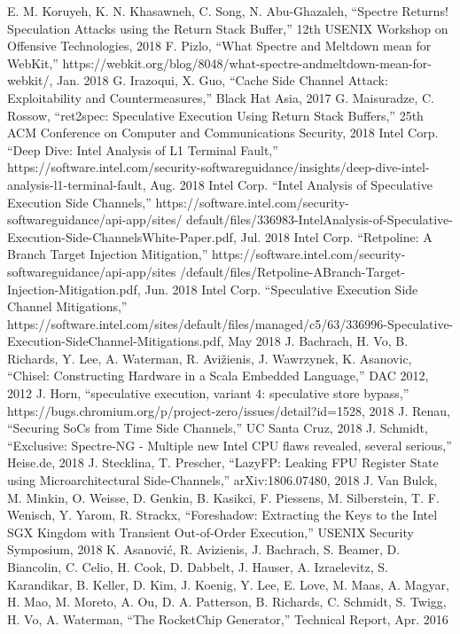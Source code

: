 \begin{thebibliography}{00}
     E. M. Koruyeh, K. N. Khasawneh, C. Song, N. Abu-Ghazaleh, ``Spectre Returns! Speculation Attacks using the Return Stack Buffer,'' 12th USENIX Workshop on Offensive Technologies, 2018
     F. Pizlo, ``What Spectre and Meltdown mean for WebKit,'' https://webkit.org/blog/8048/what-spectre-andmeltdown-mean-for-webkit/, Jan. 2018
     G. Irazoqui, X. Guo, ``Cache Side Channel Attack: Exploitability and Countermeasures,'' Black Hat Asia, 2017
     G. Maisuradze, C. Rossow, ``ret2spec: Speculative Execution Using Return Stack Buffers,'' 25th ACM Conference on Computer and Communications Security, 2018
     Intel Corp. ``Deep Dive: Intel Analysis of L1 Terminal Fault,'' https://software.intel.com/security-softwareguidance/insights/deep-dive-intel-analysis-l1-terminal-fault, Aug. 2018
     Intel Corp. ``Intel Analysis of Speculative Execution Side Channels,'' https://software.intel.com/security-softwareguidance/api-app/sites/ default/files/336983-IntelAnalysis-of-Speculative-Execution-Side-ChannelsWhite-Paper.pdf, Jul. 2018
     Intel Corp. ``Retpoline: A Branch Target Injection Mitigation,'' https://software.intel.com/security-softwareguidance/api-app/sites /default/files/Retpoline-ABranch-Target-Injection-Mitigation.pdf, Jun. 2018
     Intel Corp. ``Speculative Execution Side Channel Mitigations,'' https://software.intel.com/sites/default/files/managed/c5/63/336996-Speculative-Execution-SideChannel-Mitigations.pdf, May 2018
     J. Bachrach, H. Vo, B. Richards, Y. Lee, A. Waterman, R. Avižienis, J. Wawrzynek, K. Asanovic, ``Chisel: Constructing Hardware in a Scala Embedded Language,'' DAC 2012, 2012
     J. Horn, ``speculative execution, variant 4: speculative store bypass,'' https://bugs.chromium.org/p/project-zero/issues/detail?id=1528, 2018
     J. Renau, ``Securing SoCs from Time Side Channels,'' UC Santa Cruz, 2018
     J. Schmidt, ``Exclusive: Spectre-NG - Multiple new Intel CPU flaws revealed, several serious,'' Heise.de, 2018
     J. Stecklina, T. Prescher, ``LazyFP: Leaking FPU Register State using Microarchitectural Side-Channels,'' arXiv:1806.07480, 2018
     J. Van Bulck, M. Minkin, O. Weisse, D. Genkin, B. Kasikci, F. Piessens, M. Silberstein, T. F. Wenisch, Y. Yarom, R. Strackx, ``Foreshadow: Extracting the Keys to the Intel SGX Kingdom with Transient Out-of-Order Execution,'' USENIX Security Symposium, 2018
     K. Asanović, R. Avizienis, J. Bachrach, S. Beamer, D. Biancolin, C. Celio, H. Cook, D. Dabbelt, J. Hauser, A. Izraelevitz, S. Karandikar, B. Keller, D. Kim, J. Koenig, Y. Lee, E. Love, M. Maas, A. Magyar, H. Mao, M. Moreto, A. Ou, D. A. Patterson, B. Richards, C. Schmidt, S. Twigg, H. Vo, A. Waterman, ``The RocketChip Generator,'' Technical Report, Apr. 2016

\end{thebibliography}
